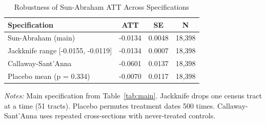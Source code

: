 \begin{table}[htbp]
\centering
\caption{Robustness of Sun-Abraham ATT Across Specifications}
\label{tab:robustness}
\small
\begin{tabular}{lccc}
\toprule
Specification & ATT & SE & N \\
\midrule
Sun-Abraham (main) & -0.0134 & 0.0048 & 18,398 \\
Jackknife range [-0.0155, -0.0119] & -0.0134 & 0.0007 & 18,398 \\
Callaway-Sant'Anna & -0.0601 & 0.0137 & 18,398 \\
Placebo mean (p = 0.334) & -0.0070 & 0.0117 & 18,398 \\
\bottomrule
\end{tabular}
\begin{tablenotes}\small
\item \textit{Notes:} Main specification from Table~\ref{tab:main}. Jackknife drops one census tract at a time (51 tracts). Placebo permutes treatment dates 500 times. Callaway-Sant'Anna uses repeated cross-sections with never-treated controls.
\end{tablenotes}
\end{table}
